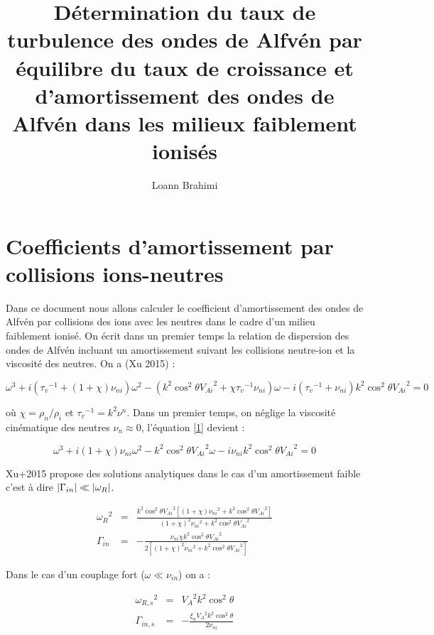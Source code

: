 \documentclass[10pt,a4paper]{article}
\author{Loann Brahimi}
\title{Détermination du taux de turbulence des ondes de Alfvén par équilibre du taux de croissance et d'amortissement des ondes de Alfvén dans les milieux faiblement ionisés}
\begin{document}
\maketitle 

\section*{Coefficients d'amortissement par collisions ions-neutres}

Dans ce document nous allons calculer le coefficient d'amortissement des ondes de Alfvén par collisions des ions avec les neutres dans le cadre d'un milieu faiblement ionisé. On écrit dans un premier temps la relation de dispersion des ondes de Alfvén incluant un amortissement suivant les collisions neutre-ion et la viscosité des neutres. On a (Xu 2015) :

\begin{equation}
	\omega^3 + i\left({\tau_v}^{-1} + (1+\chi)\nu_{ni}\right)\omega^2 - \left(k^2\cos^2{\theta} {V_{Ai}}^2 + 
	\chi{\tau_v}^{-1}\nu_{ni}\right)\omega - i\left({\tau_v}^{-1} + \nu_{ni}\right)k^2\cos^2{\theta} {V_{Ai}}^2 = 0
	\label{1}
\end{equation}

où $\chi = \rho_n / \rho_i$ et ${\tau_v}^{-1} = k^2 \nu^n$. Dans un premier temps, on néglige la viscosité cinématique des neutres $\nu_n \approx 0$, l'équation \ref{1} devient : 

\begin{equation}
	\omega^3 + i(1+\chi)\nu_{ni}\omega^2 - k^2\cos^2{\theta} {V_{Ai}}^2\omega - i\nu_{ni}k^2\cos^2{\theta} {V_{Ai}}^2 = 0
	\label{2}
\end{equation}

Xu+2015 propose des solutions analytiques dans le cas d'un amortissement faible c'est à dire $\abs{\Gamma_{in}} \ll \abs{\omega_R}$. 

\begin{eqnarray}
	{\omega_R}^2 & = & \frac{k^2\cos^2{\theta}{V_{Ai}}^2 \left[(1+\chi){\nu_{ni}}^2 + k^2 \cos^2{\theta} {V_{Ai}}^2\right]}{(1+\chi)^2{\nu_{ni}}^2 + k^2 \cos^2{\theta} {V_{Ai}}^2} \\
	\Gamma_{in}  & = & - \frac{\nu_{ni}\chi  k^2 \cos^2{\theta} {V_{Ai}}^2}{2\left[ (1+\chi)^2{\nu_{ni}}^2 + k^2 \cos^2{\theta} {V_{Ai}}^2 \right]}
\end{eqnarray}

Dans le cas d'un couplage fort ($\omega \ll \nu_{in}$) on a : 

\begin{eqnarray}
	{\omega_{R,s}}^2 & = & {V_{A}}^2 k^2 \cos^2{\theta} \\ 
	\Gamma_{in,s}  & = & - \frac{\xi_n  {V_{A}}^2 k^2 \cos^2{\theta}}{2 \nu_{ni}}
\end{eqnarray}
\end{document}
